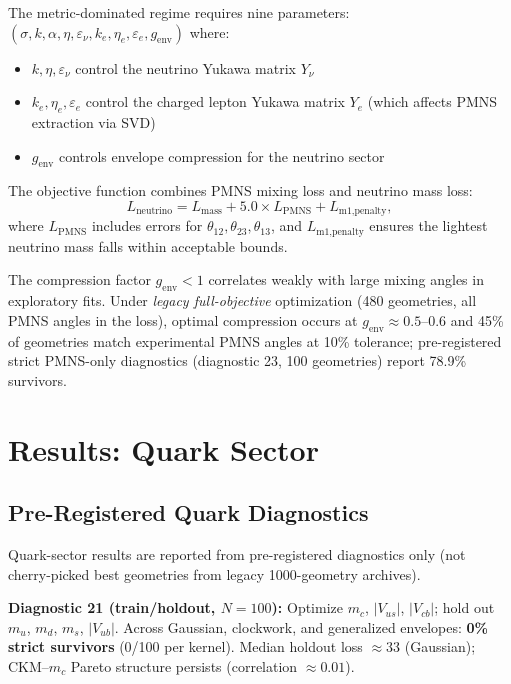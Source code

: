 \documentclass[12pt,a4paper]{article}
\begin{document}
The metric-dominated regime requires nine parameters: $(\sigma, k, \alpha, \eta, \varepsilon_\nu, k_e, \eta_e, \varepsilon_e, g_{\text{env}})$ where:
\begin{itemize}
\item $k, \eta, \varepsilon_\nu$ control the neutrino Yukawa matrix $Y_\nu$
\item $k_e, \eta_e, \varepsilon_e$ control the charged lepton Yukawa matrix $Y_e$ (which affects PMNS extraction via SVD)
\item $g_{\text{env}}$ controls envelope compression for the neutrino sector
\end{itemize}

The objective function combines PMNS mixing loss and neutrino mass loss:
\begin{equation}
L_{\text{neutrino}} = L_{\text{mass}} + 5.0 \times L_{\text{PMNS}} + L_{\text{m1,penalty}},
\end{equation}
where $L_{\text{PMNS}}$ includes errors for $\theta_{12}, \theta_{23}, \theta_{13}$, and $L_{\text{m1,penalty}}$ ensures the lightest neutrino mass falls within acceptable bounds.

The compression factor $g_{\text{env}} < 1$ correlates weakly with large mixing angles in exploratory fits. Under \emph{legacy full-objective} optimization (480 geometries, all PMNS angles in the loss), optimal compression occurs at $g_{\text{env}} \approx 0.5$--0.6 and 45\% of geometries match experimental PMNS angles at 10\% tolerance; pre-registered strict PMNS-only diagnostics (diagnostic 23, 100 geometries) report 78.9\% survivors.

\section{Results: Quark Sector}

\subsection{Pre-Registered Quark Diagnostics}

Quark-sector results are reported from pre-registered diagnostics only (not cherry-picked best geometries from legacy 1000-geometry archives).

\textbf{Diagnostic 21 (train/holdout, $N=100$):} Optimize $m_c$, $|V_{us}|$, $|V_{cb}|$; hold out $m_u$, $m_d$, $m_s$, $|V_{ub}|$. Across Gaussian, clockwork, and generalized envelopes: \textbf{0\% strict survivors} (0/100 per kernel). Median holdout loss $\approx 33$ (Gaussian); CKM--$m_c$ Pareto structure persists (correlation $\approx 0.01$).
\end{document}
